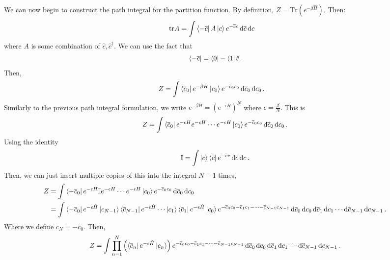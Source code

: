 \documentclass{article}
\numberwithin{equation}{section}
\begin{document}
We can now begin to construct the path integral for the partition function. By definition, $Z=\text{Tr}(e^{-\beta\hat{H}}).$ Then:
\begin{align}
    \text{tr}A &= \int \bra{-\overline{c}}A\ket{c} e^{-\overline{c}c}\dd{\overline{c}}\dd{c}
\end{align}
where $A$ is some combination of $\hat{c},\hat{c}^\dagger.$ We can use the fact that 
\begin{equation}
    \bra{-\overline{c}} = \bra{0} - \bra{1}\hat{c}.
\end{equation}
Then,
\begin{align}
    Z &= \int \bra{\overline{c}_0}e^{-\beta\hat{H}}\ket{c_0} e^{-\overline{c}_0c_0}\dd{\overline{c}_0}\dd{c_0}.
\end{align}
Similarly to the previous path integral formulation, we write $e^{-\beta \hat{H}} = (e^{-\epsilon H})^N$ where $\epsilon = \frac{\beta}{N}.$ This is 
\begin{equation}
    Z = \int \bra{\overline{c}_0}e^{-\epsilon H}e^{-\epsilon H}\cdots e^{-\epsilon H}\ket{c_0} e^{-\overline{c}_0c_0}\dd{\overline{c}_0}\dd{c_0}.
\end{equation}
Using the identity 
\begin{equation}
    \mathbb{I} = \int \ket{c}\bra{\overline{c}} e^{-\overline{c}c}\dd{\overline{c}}\dd{c}.
\end{equation}
Then, we can just insert multiple copies of this into the integral $N-1$ times,
\begin{align}
    Z &= \int \bra{-\overline{c}_0}e^{-\epsilon H}\mathbb{I}e^{-\epsilon H}\cdots e^{-\epsilon H}\ket{c_0} e^{-\overline{c}_0c_0}\dd{\overline{c}_0}\dd{c_0} \\
    &= \int \bra{-\overline{c}_0}e^{-\epsilon \hat{H}}\ket{c_{N-1}}\bra{\overline{c}_{N-1}}e^{-\epsilon \hat{H}} \cdots \ket{c_1}\bra{\overline{c}_1}e^{-\epsilon \hat{H}}\ket{c_0}e^{-\overline{c}_0c_0-\overline{c}_1c_1-\cdots - \overline{c}_{N-1} c_{N-1}}\dd{\overline{c}_0}\dd{c_0}\dd{\overline{c}_1}\dd{c_1}\cdots\dd{\overline{c}_{N-1}}\dd{c_{N-1}}.
\end{align}
Where we define $\overline{c}_N = -\overline{c}_0.$ Then,
\begin{align}
    Z = \int \prod_{n=1}^N \left(\bra{\overline{c}_n} e^{-\epsilon \hat{H}} \ket{c_n} \right)e^{-\overline{c}_0c_0-\overline{c}_1c_1-\cdots - \overline{c}_{N-1} c_{N-1}}\dd{\overline{c}_0}\dd{c_0}\dd{\overline{c}_1}\dd{c_1}\cdots\dd{\overline{c}_{N-1}}\dd{c_{N-1}}.
\end{align}
\end{document}
